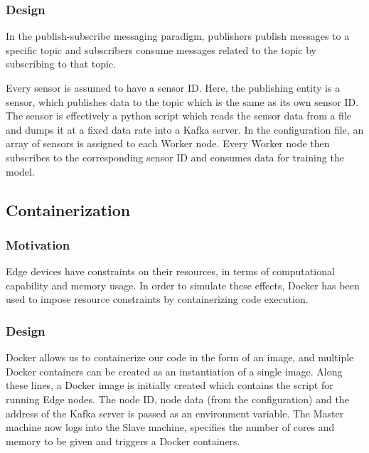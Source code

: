 \documentclass[a4paper, 12pt]{article}
\begin{document}
\subsubsection{Design}
In the publish-subscribe messaging paradigm, publishers publish messages to a specific topic and subscribers consume messages related to the topic by subscribing to that topic. 

Every sensor is assumed to have a sensor ID. Here, the publishing entity is a sensor, which publishes data to the topic which is the same as its own sensor ID. The sensor is effectively a python script which reads the sensor data from a file and dumps it at a fixed data rate into a Kafka server.
In the configuration file, an array of sensors is assigned to each Worker node. Every Worker node then subscribes to the corresponding sensor ID and consumes data for training the model.

\subsection{Containerization}
\subsubsection{Motivation}
Edge devices have constraints on their resources, in terms of computational capability and memory usage. In order to simulate these effects, Docker has been used to impose resource constraints by containerizing code execution.
\subsubsection{Design}
Docker allows us to containerize our code in the form of an image, and multiple Docker containers can be created as an instantiation of a single image. Along these lines, a Docker image is initially created which contains the script for running Edge nodes. The node ID, node data (from the configuration) and the address of the Kafka server is passed as an environment variable.
The Master machine now logs into the Slave machine, specifies the number of cores and memory to be given and triggers a Docker containers.  
\end{document}
